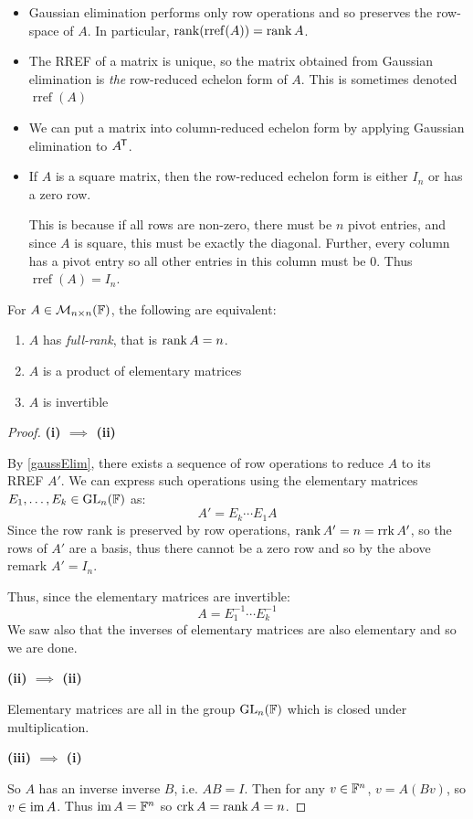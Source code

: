 \documentclass[../main.tex]{subfiles}
\begin{document}
\begin{remark}[Remarks] \label{RREFRemarks}
  \begin{itemize}
    \item Gaussian elimination performs only row operations and so preserves the row-space of $A$.
      In particular, $\operatorname{rank}(\operatorname{rref}(A)) = \operatorname{rank} A$.
    \item The RREF of a matrix is unique, so the matrix obtained from Gaussian elimination is \textit{the} row-reduced echelon form of $A$.
      This is sometimes denoted $\operatorname{rref}(A)$
    \item We can put a matrix into column-reduced echelon form by applying Gaussian elimination to $A^{{\mkern-1.5mu\mathsf{T}}}$.
    \item If $A$ is a square matrix, then the row-reduced echelon form is either $I_n$ or has a zero row.

      This is because if all rows are non-zero, there must be $n$ pivot entries, and since $A$ is square, this must be exactly the diagonal.
      Further, every column has a pivot entry so all other entries in this column must be 0.
      Thus $\operatorname{rref}(A) = I_n$.
  \end{itemize}
\end{remark}
\begin{theorem}
  For $A \in \mathcal{M}_{n \times n}(\mathbb{F})$, the following are equivalent: \label{equivOperations}
  \begin{enumerate}
    \item $A$ has \textit{full-rank}, that is $\operatorname{rank} A = n$.
    \item $A$ is a product of elementary matrices
    \item $A$ is invertible
  \end{enumerate}
\end{theorem}
\begin{proof}\par
  \textbf{(i) $\implies$ (ii)}\par
  By \cref{gaussElim}, there exists a sequence of row operations to reduce $A$ to its RREF $A'$.
  We can express such operations using the elementary matrices $E_1, \ldots, E_k \in \mathrm{GL}_n(\mathbb{F})$ as:
  \[
    A' = E_{k} \cdots E_1 A
  \]
  Since the row rank is preserved by row operations, $\operatorname{rank} A' = n = \operatorname{rrk} A'$, so the rows of $A'$ are a basis, thus there cannot be a zero row and so by the above remark $A' = I_n$.

  Thus, since the elementary matrices are invertible:
  \[
    A = E^{-1}_{1} \cdots E^{-1}_{k}
  \]
  We saw also that the inverses of elementary matrices are also elementary and so we are done.

  \textbf{(ii) $\implies$ (ii)}\par
  Elementary matrices are all in the group $\mathrm{GL}_n(\mathbb{F})$ which is closed under multiplication.

  \textbf{(iii) $\implies$ (i)}\par
  So $A$ has an inverse inverse $B$, i.e. $A B = I$.
  Then for any $v \in \mathbb{F}^n$, $v = A(B v)$, so $v \in \operatorname{im} A$.
  Thus $\operatorname{im} A = \mathbb{F}^n$ so $\operatorname{crk} A = \operatorname{rank} A =  n$.
\end{proof}
\end{document}
